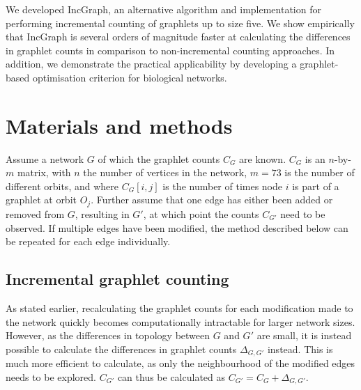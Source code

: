We developed IncGraph, an alternative algorithm and implementation for performing incremental counting of graphlets up to size five. We show empirically that IncGraph is several orders of magnitude faster at calculating the differences in graphlet counts in comparison to non-incremental counting approaches. In addition, we demonstrate the practical applicability by developing a graphlet-based optimisation criterion for biological networks.


\section*{Materials and methods}
Assume a network $G$ of which the graphlet counts $C_G$ are known. $C_G$ is an $n$-by-$m$ matrix, with $n$ the number of vertices in the network, $m = 73$ is the number of different orbits, and where $C_G[i,j]$ is the number of times node $i$ is part of a graphlet at orbit $O_j$. 
Further assume that one edge has either been added or removed from $G$, resulting in $G'$, at which point the counts $C_{G'}$ need to be observed. If multiple edges have been modified, the method described below can be repeated for each edge individually.

\subsection*{Incremental graphlet counting}
As stated earlier, recalculating the graphlet counts for each modification made to the network quickly becomes computationally intractable for larger network sizes. However, as the differences in topology between $G$ and $G'$ are small, it is instead possible to calculate the differences in graphlet counts $\Delta_{G, G'}$ instead. This is much more efficient to calculate, as only the neighbourhood of the modified edges needs to be explored. $C_{G'}$ can thus be calculated as $C_{G'} = C_G + \Delta_{G,G'}$.


